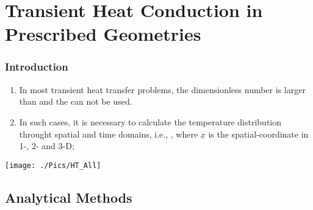 \documentclass[10pt,compress,handout,unknownkeysallowed]{beamer}
\begin{document}
\section{Transient Heat Conduction in Prescribed Geometries}

\begin{frame}
 \frametitle{Introduction}
   \begin{enumerate}%
     \item<1-> In most transient heat transfer problems, the  dimensionless number is larger than  and the  can not be used.
     \item<2-> In such cases, it is necessary to calculate the temperature distribution throught spatial and time domains, i.e., , where $\underline{x}$ is the spatial-coordinate in 1-, 2- and 3-D;
   \end{enumerate}

   \begin{center}
      \texttt{[image: ./Pics/HT\_All]}
   \end{center}
\end{frame}


\subsection{Analytical Methods}
\end{document}
